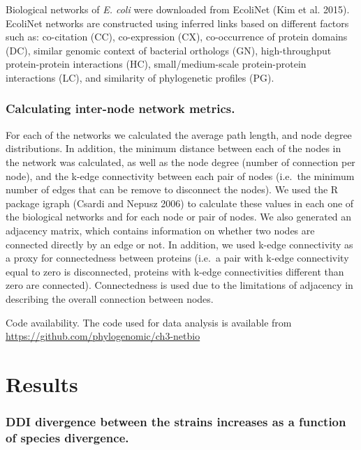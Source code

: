 \documentclass[
]{article}
\begin{document}
Biological networks of \emph{E. coli} were downloaded from EcoliNet (Kim et al. 2015). EcoliNet networks are constructed using inferred links based on different factors such as: co-citation (CC), co-expression (CX), co-occurrence of protein domains (DC), similar genomic context of bacterial orthologs (GN), high-throughput protein-protein interactions (HC), small/medium-scale protein-protein interactions (LC), and similarity of phylogenetic profiles (PG).

\hypertarget{calculating-inter-node-network-metrics.}{%
\subsubsection{Calculating inter-node network metrics.}\label{calculating-inter-node-network-metrics.}}

For each of the networks we calculated the average path length, and node degree distributions. In addition, the minimum distance between each of the nodes in the network was calculated, as well as the node degree (number of connection per node), and the k-edge connectivity between each pair of nodes (i.e.~the minimum number of edges that can be remove to disconnect the nodes). We used the R package igraph (Csardi and Nepusz 2006) to calculate these values in each one of the biological networks and for each node or pair of nodes. We also generated an adjacency matrix, which contains information on whether two nodes are connected directly by an edge or not. In addition, we used k-edge connectivity as a proxy for connectedness between proteins (i.e.~a pair with k-edge connectivity equal to zero is disconnected, proteins with k-edge connectivities different than zero are connected). Connectedness is used due to the limitations of adjacency in describing the overall connection between nodes.

Code availability. The code used for data analysis is available from \url{https://github.com/phylogenomic/ch3-netbio}

\hypertarget{results}{%
\section{Results}\label{results}}

\hypertarget{ddi-divergence-between-the-strains-increases-as-a-function-of-species-divergence.}{%
\subsubsection{DDI divergence between the strains increases as a function of species divergence.}\label{ddi-divergence-between-the-strains-increases-as-a-function-of-species-divergence.}}
\end{document}
